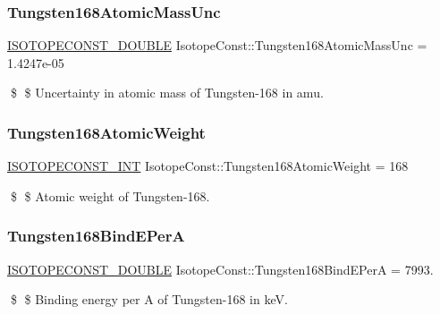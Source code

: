 \subsubsection{\texorpdfstring{Tungsten168\+Atomic\+Mass\+Unc}{Tungsten168AtomicMassUnc}}
{\footnotesize\ttfamily \mbox{\hyperlink{group___isotope_const-_macros_ga8f45a7272ce02c0b4c65c44636ed719a}{I\+S\+O\+T\+O\+P\+E\+C\+O\+N\+S\+T\+\_\+\+D\+O\+U\+B\+LE}} Isotope\+Const\+::\+Tungsten168\+Atomic\+Mass\+Unc = 1.\+4247e-\/05}

\$ \$ Uncertainty in atomic mass of Tungsten-\/168 in amu. \mbox{\label{group___isotope_const-_tungsten-_w168_ga196eb41250b06e6edfee24317258c612}} 
\subsubsection{\texorpdfstring{Tungsten168\+Atomic\+Weight}{Tungsten168AtomicWeight}}
{\footnotesize\ttfamily \mbox{\hyperlink{group___isotope_const-_macros_ga5f18360b3e99483a35c32d789e62621c}{I\+S\+O\+T\+O\+P\+E\+C\+O\+N\+S\+T\+\_\+\+I\+NT}} Isotope\+Const\+::\+Tungsten168\+Atomic\+Weight = 168}

\$ \$ Atomic weight of Tungsten-\/168. \mbox{\label{group___isotope_const-_tungsten-_w168_ga6fb6b39c64f3de38c6463f01b9cafaa5}} 
\subsubsection{\texorpdfstring{Tungsten168\+Bind\+E\+PerA}{Tungsten168BindEPerA}}
{\footnotesize\ttfamily \mbox{\hyperlink{group___isotope_const-_macros_ga8f45a7272ce02c0b4c65c44636ed719a}{I\+S\+O\+T\+O\+P\+E\+C\+O\+N\+S\+T\+\_\+\+D\+O\+U\+B\+LE}} Isotope\+Const\+::\+Tungsten168\+Bind\+E\+PerA = 7993.}

\$ \$ Binding energy per A of Tungsten-\/168 in keV. \mbox{\label{group___isotope_const-_tungsten-_w168_ga6c6283524697ba5dcceb4f645404b8ec}} 
